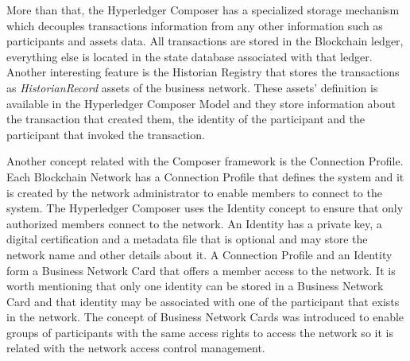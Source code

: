 More than that, the Hyperledger Composer has a specialized storage mechanism which decouples transactions information from any other information such as participants and assets data. All transactions are stored in the Blockchain ledger, everything else is located in the state database associated with that ledger. Another interesting feature is the Historian Registry that stores the transactions as \emph{HistorianRecord} assets of the business network. These assets' definition is available in the Hyperledger Composer Model and they store information about the transaction that created them, the identity of the participant and the participant that invoked the transaction.

Another concept related with the Composer framework is the Connection Profile. Each Blockchain Network has a Connection Profile that defines the system and it is created by the network administrator to enable members to connect to the system. The Hyperledger Composer uses the Identity concept to ensure that only authorized members connect to the network. An Identity has a private key, a digital certification and a metadata file that is optional and may store the network name and other details about it. A Connection Profile and an Identity form a Business Network Card that offers a member access to the network. It is worth mentioning that only one identity can be stored in a Business Network Card and that identity may be associated with one of the participant that exists in the network. The concept of Business Network Cards was introduced to enable groups of participants with the same access rights to access the network so it is related with the network access control management.



 
